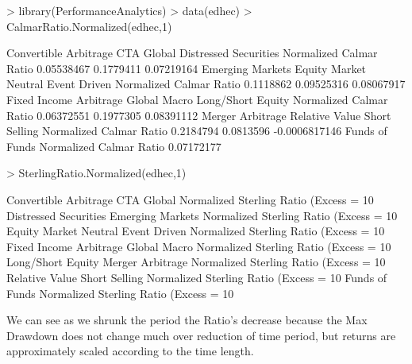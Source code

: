 \documentclass[12pt,letterpaper,english]{article}
\begin{document}
\begin{Schunk}
\begin{Sinput}
> library(PerformanceAnalytics)
> data(edhec)
> CalmarRatio.Normalized(edhec,1)
\end{Sinput}
\begin{Soutput}
                        Convertible Arbitrage CTA Global Distressed Securities
Normalized Calmar Ratio            0.05538467  0.1779411            0.07219164
                        Emerging Markets Equity Market Neutral Event Driven
Normalized Calmar Ratio        0.1118862            0.09525316   0.08067917
                        Fixed Income Arbitrage Global Macro Long/Short Equity
Normalized Calmar Ratio             0.06372551    0.1977305        0.08391112
                        Merger Arbitrage Relative Value Short Selling
Normalized Calmar Ratio        0.2184794      0.0813596 -0.0006817146
                        Funds of Funds
Normalized Calmar Ratio     0.07172177
\end{Soutput}
\begin{Sinput}
> SterlingRatio.Normalized(edhec,1)
\end{Sinput}
\begin{Soutput}
                                         Convertible Arbitrage CTA Global
Normalized Sterling Ratio (Excess = 10%)             0.0412807 0.09585286
                                         Distressed Securities Emerging Markets
Normalized Sterling Ratio (Excess = 10%)            0.05026439       0.08755194
                                         Equity Market Neutral Event Driven
Normalized Sterling Ratio (Excess = 10%)            0.05007166   0.05385919
                                         Fixed Income Arbitrage Global Macro
Normalized Sterling Ratio (Excess = 10%)             0.04086785   0.08740785
                                         Long/Short Equity Merger Arbitrage
Normalized Sterling Ratio (Excess = 10%)        0.05754033        0.0787349
                                         Relative Value Short Selling
Normalized Sterling Ratio (Excess = 10%)     0.04999597 -0.0005672599
                                         Funds of Funds
Normalized Sterling Ratio (Excess = 10%)     0.04827673
\end{Soutput}
\end{Schunk}

We can see as we shrunk the period the Ratio's decrease because the Max Drawdown does not change much over reduction of time period, but returns are approximately scaled according to  the time length. 
\end{document}
